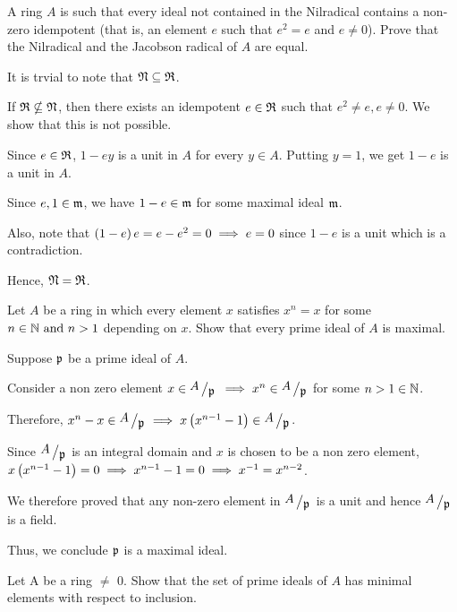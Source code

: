 \begin{exercise}{}{}
	A ring \( A \) is such that every ideal not contained in the Nilradical
	contains a non-zero idempotent (that is, an element \( e \) such that
	\( e^2 = e \) and \( e \neq 0 \)).
	Prove that the Nilradical and the Jacobson radical of \( A \) are equal.
\end{exercise}

It is trvial to note that \(\mathfrak{N} \subseteq \mathfrak{R}\).

If \(\mathfrak{R} \nsubseteq \mathfrak{N}\), then there exists an idempotent \(e \in \mathfrak{R}\)
such that \(e^2 \neq e, e \neq 0\).
We show that this is not possible.

Since \(e \in \mathfrak{R}\), \(1 - ey\) is a unit in \(A\) for every \(y \in A\).
Putting \(y = 1\), we get \(1 - e\) is a unit in \(A\).

Since \(e, 1 \in \mathfrak{m}\), we have \(1-e \in \mathfrak{m}\) for some maximal ideal
\(\mathfrak{m}\).

Also, note that \(\left( 1-e \right)e = e - e^2 = 0 \implies e = 0\)
since \(1-e\) is a unit which is a contradiction.

Hence, \(\mathfrak{N} = \mathfrak{R}\).


\begin{exercise}{}{}
	Let \( A \) be a ring in which every element \( x \) satisfies
	\( x^n = x \) for some \( n \in \NN \AND n > 1 \) depending on \( x \).
	Show that every prime ideal of \( A \) is maximal.
\end{exercise}

Suppose \( \mathfrak{p} \) be a prime ideal of \( A \).

Consider a non zero element \( x \in \bigslant{A}{\mfp} \)
\( \implies x^n \in \bigslant{A}{\mfp} \) for some \( n>1 \in \NN \).

Therefore, \( x^n - x \in \bigslant{A}{\mfp} \implies x\brak{x^{n-1} - 1}
\in \bigslant{A}{\mfp} \).

Since \( \bigslant{A}{\mfp} \) is an integral domain and
\( x \) is chosen to be a non zero element, \\
\( x\left( x^{n-1} - 1 \right) = 0 \implies x^{n-1} - 1 = 0
\implies x^{-1} = x^{n-2} \).

We therefore proved that any non-zero element in \( \bigslant{A}{\mfp} \)
is a unit and hence \( \bigslant{A}{\mfp} \) is a field.

Thus, we conclude \( \mathfrak{p} \) is a maximal ideal.


\begin{exercise}{}{}
	Let A be a ring \(\neq\) 0.
	Show that the set of prime ideals of \(A\) has minimal elements
	with respect to inclusion.
\end{exercise}

